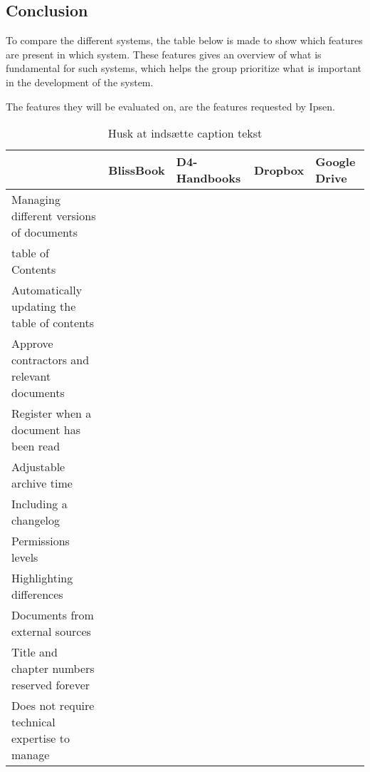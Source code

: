 \subsection{Conclusion}
To compare the different systems, the table below is made to show which features are present in which system. These features gives an overview of what is fundamental for such systems, which helps the group prioritize what is important in the development of the system.

The features they will be evaluated on, are the features requested by Ipsen.

\begin{table}[H]
	\begin{center}
		\begin{tabular}{| m{5cm}|m{1.6cm}|m{2cm}|m{1.5cm}|m{1.2cm}|}
			\hline
			 & BlissBook  & D4-Handbooks & Dropbox & Google \newline Drive \\ 
			\hline
			Managing different versions of documents & \checkmark &  &  & \\ 
			\hline
			table of Contents & \checkmark & \checkmark  & \checkmark & \checkmark \\ 
			\hline
			Automatically updating the table of contents & \checkmark & \checkmark  & \checkmark & \checkmark \\ 
			\hline
			Approve contractors and \newline relevant documents &  &  &  & \\ 
			\hline
			Register when a document has been read & \checkmark & \checkmark &  & \\ 
			\hline
			Adjustable archive time &  &  &  & \\ 
			\hline
			Including a changelog & \checkmark & \checkmark  & \checkmark & \checkmark \\ 
			\hline
			Permissions levels & \checkmark &  &  & \\ 
			\hline
			Highlighting differences & \checkmark &  &  & \\ 
			\hline
			Documents from external \newline sources &  &  & \checkmark & \checkmark \\ 
			\hline
			Title and chapter numbers \newline reserved forever &  &  &  & \\ 
			\hline
			Does not require technical \newline expertise to manage & \checkmark & \checkmark  & \checkmark & \checkmark \\ 
			\hline
		\end{tabular}
	\caption{{\color{red} Husk at indsætte caption tekst}}\label{tab:Exsisting}
	\end{center}
\end{table}

